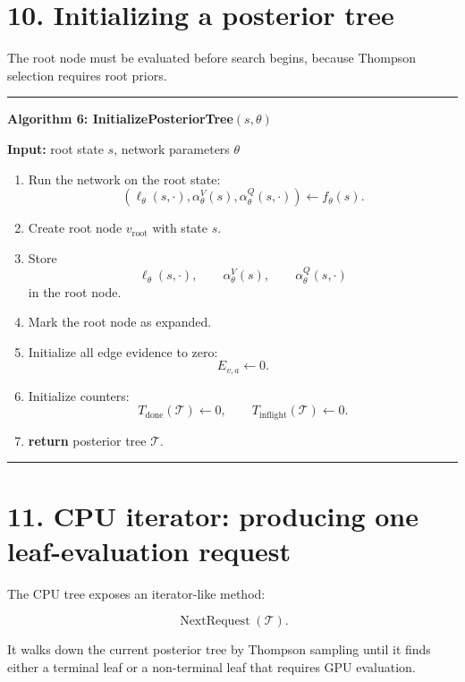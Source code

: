 \documentclass[11pt]{article}
\newcommand{\Tree}{\mathcal{T}}
\newcommand{\NextRequest}{\operatorname{NextRequest}}
\newenvironment{algorithmblock}[1]
{
  \par\medskip
  \noindent\hrule\par\smallskip
  \noindent\textbf{#1}
  \par\smallskip
}
{
  \par\smallskip\noindent\hrule\par\medskip
}
\newcommand{\Input}{\textbf{Input: }}
\newcommand{\Return}{\textbf{return }}
\begin{document}
\section*{10. Initializing a posterior tree}

The root node must be evaluated before search begins, because Thompson selection
requires root priors.

\begin{algorithmblock}{Algorithm 6: InitializePosteriorTree\((s,\theta)\)}

\Input root state \(s\), network parameters \(\theta\)

\begin{enumerate}[leftmargin=2em]
  \item Run the network on the root state:
  \[
  \left(
  \ell_\theta(s,\cdot),
  \alpha_\theta^V(s),
  \alpha_\theta^Q(s,\cdot)
  \right)
  \gets
  f_\theta(s).
  \]

  \item Create root node \(v_{\mathrm{root}}\) with state \(s\).

  \item Store
  \[
  \ell_\theta(s,\cdot),
  \qquad
  \alpha_\theta^V(s),
  \qquad
  \alpha_\theta^Q(s,\cdot)
  \]
  in the root node.

  \item Mark the root node as expanded.

  \item Initialize all edge evidence to zero:
  \[
  E_{v,a} \gets 0.
  \]

  \item Initialize counters:
  \[
  T_{\mathrm{done}}(\Tree) \gets 0,
  \qquad
  T_{\mathrm{inflight}}(\Tree) \gets 0.
  \]

  \item \Return posterior tree \(\Tree\).
\end{enumerate}

\end{algorithmblock}

\section*{11. CPU iterator: producing one leaf-evaluation request}

The CPU tree exposes an iterator-like method:

\[
\NextRequest(\Tree).
\]

It walks down the current posterior tree by Thompson sampling until it finds
either a terminal leaf or a non-terminal leaf that requires GPU evaluation.
\end{document}
